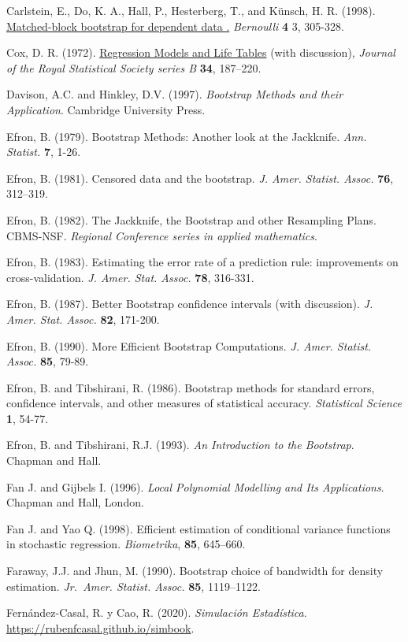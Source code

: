 \documentclass[
]{book}
\theoremstyle{break}
\theoremstyle{definition}
\theoremstyle{definition}
\theoremstyle{definition}
\theoremstyle{definition}
\theoremstyle{remark}
\begin{document}
Carlstein, E., Do, K. A., Hall, P., Hesterberg, T., and Künsch, H. R. (1998). \href{https://projecteuclid.org/euclid.bj/1174324983}{Matched-block bootstrap for dependent data .}
\emph{Bernoulli} \textbf{4} 3, 305-328.

Cox, D. R. (1972). \href{https://rss.onlinelibrary.wiley.com/doi/abs/10.1111/j.2517-6161.1972.tb00899.x}{Regression Models and Life Tables}
(with discussion), \emph{Journal of the Royal Statistical Society series B} \textbf{34}, 187--220.

Davison, A.C. and Hinkley, D.V. (1997).
\emph{Bootstrap Methods and their Application}. Cambridge University Press.

Efron, B. (1979). Bootstrap Methods: Another look at the Jackknife.
\emph{Ann. Statist.} \textbf{7}, 1-26.

Efron, B. (1981). Censored data and the bootstrap.
\emph{J. Amer. Statist. Assoc.} \textbf{76}, 312--319.

Efron, B. (1982). The Jackknife, the Bootstrap and other Resampling
Plans. CBMS-NSF. \emph{Regional Conference series in applied mathematics}.

Efron, B. (1983). Estimating the error rate of a prediction rule:
improvements on cross-validation. \emph{J. Amer. Stat. Assoc.} \textbf{78}, 316-331.

Efron, B. (1987). Better Bootstrap confidence intervals (with
discussion). \emph{J. Amer. Stat. Assoc.} \textbf{82}, 171-200.

Efron, B. (1990). More Efficient Bootstrap Computations.
\emph{J. Amer. Statist. Assoc.} \textbf{85}, 79-89.

Efron, B. and Tibshirani, R. (1986). Bootstrap methods for standard
errors, confidence intervals, and other measures of statistical
accuracy. \emph{Statistical Science} \textbf{1}, 54-77.

Efron, B. and Tibshirani, R.J. (1993). \emph{An Introduction to the Bootstrap}.
Chapman and Hall.

Fan J. and Gijbels I. (1996). \emph{Local Polynomial Modelling and Its Applications}.
Chapman and Hall, London.

Fan J. and Yao Q. (1998). Efficient estimation of conditional variance functions in
stochastic regression. \emph{Biometrika}, \textbf{85}, 645--660.

Faraway, J.J. and Jhun, M. (1990). Bootstrap choice of bandwidth for
density estimation. \emph{Jr.~Amer. Statist. Assoc.} \textbf{85}, 1119--1122.

Fernández-Casal, R. y Cao, R. (2020). \emph{Simulación Estadística}. \url{https://rubenfcasal.github.io/simbook}.
\end{document}

